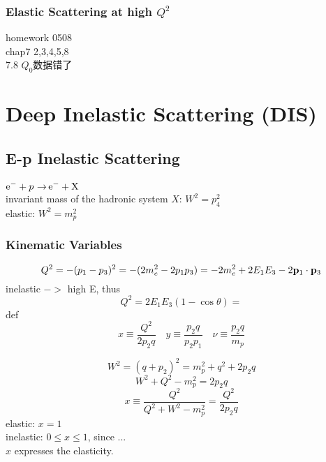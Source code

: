 \documentclass[a4paper]{article}
\DeclareMathOperator{\ra}{\rightarrow}
\numberwithin{equation}{section}
\begin{document}
\subsubsection{Elastic Scattering at high $ Q^2 $}



homework 0508\\
chap7 2,3,4,5,8\\
7.8 $ Q_0 $数据错了

\section{Deep Inelastic Scattering (DIS)}
\subsection{E-p Inelastic Scattering}
$ \ce{e^- + p \ra e^- + X} $\\
invariant mass of the hadronic system $ X $: $ W^2 = p_4^2 $\\
elastic: $ W^2 = m_p^2 $\\
\subsubsection{Kinematic Variables}
\begin{equation}\label{key}
Q^2 = -(p_1 - p_3)^2 = -(2m_e^2 - 2p_1p_3) = -2m_e^2 + 2E_1E_3 - 2\vb{p}_1\cdot\vb{p}_3
\end{equation}
inelastic $ -> $ high E, thus
\begin{equation}\label{key}
Q^2 = 2E_1E_3(1 - \cos\theta) = 
\end{equation}
def
\begin{equation}\label{key}
x \equiv \dfrac{Q^2}{2p_2 q} \quad y \equiv \dfrac{p_2 q}{p_2 p_1} \quad \nu \equiv \dfrac{p_2 q}{m_p}
\end{equation}

\begin{equation}\label{key}
W^2 = (q + p_2)^2 = m_p^2 + q^2 + 2p_2 q
\end{equation}
\begin{equation}\label{key}
W^2 + Q^2 - m_p^2 = 2p_2 q
\end{equation}
\begin{equation}\label{key}
x \equiv \dfrac{Q^2}{Q^2 + W^2 - m_p^2} = \dfrac{Q^2}{2p_2 q}
\end{equation}
elastic: $ x = 1 $\\
inelastic: $ 0 \leq x \leq 1$, since ...\\
$ x $ expresses the elasticity.\\
\end{document}
